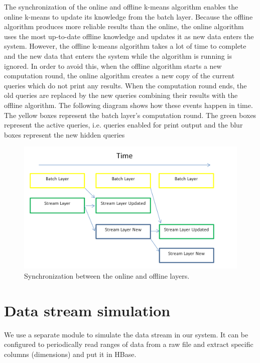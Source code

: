 \documentclass{lmproj}
\begin{document}
The synchronization of the online and offline k-means algorithm enables the online k-means to update its knowledge from the batch layer. Because the offline algorithm produces more reliable results than the online, the online algorithm uses the most up-to-date offline knowledge and updates it as new data enters the system. However, the offline k-means algorithm takes a lot of time to complete and the new data that enters the system while the algorithm is running is ignored. In order to avoid this, when the offline algorithm starts a new computation round, the online algorithm creates a new copy of the current queries which do not print any results. When the computation round ends, the old queries are replaced by the new queries combining their results with the offline algorithm. The following diagram shows how these events happen in time. The yellow boxes represent the batch layer's computation round. The green boxes represent the active queries, i.e. queries enabled for print output and the blur boxes represent the new hidden queries 

\begin{figure}[H]
	\centering	
	\includegraphics[scale=0.4]{synchronization}
	\caption{Synchronization between the online and offline layers.}
\end{figure}

\section{Data stream simulation}
\label{systemdescr}
We use a separate module to simulate the data stream in our system. It can be configured to periodically read ranges of data from a raw file and extract specific columns (dimensions) and put it in HBase. 
\end{document}

